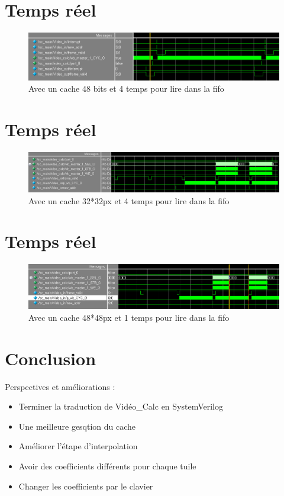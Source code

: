 \documentclass{beamer}
\begin{document}
\section{Temps réel}
\begin{frame}
\begin{figure}[!h]
\centering
\includegraphics[scale = 0.3]{wave_r.png}
\caption{Avec un cache 48 bits et 4 temps pour lire dans la fifo}
\end{figure}
\end{frame}

\section{Temps réel}
\begin{frame}
\begin{figure}[!h]
\centering
\includegraphics[scale = 0.3]{wave_cache32_r.png}
\caption{Avec un cache 32*32px et 4 temps pour lire dans la fifo}
\end{figure}
\end{frame}

\section{Temps réel}
\begin{frame}
\begin{figure}[!h]
\centering
\includegraphics[scale = 0.3]{wave_sans_wait_r.png}
\caption{Avec un cache 48*48px et 1 temps pour lire dans la fifo}
\end{figure}
\end{frame}

\section{Conclusion}
\centering
{Perspectives et améliorations :
	\begin{itemize}
		\item Terminer la traduction de Vidéo\_Calc en SystemVerilog
		\item Une meilleure gesqtion du cache
		\item Améliorer l'étape d'interpolation
		\item Avoir des coefficients différents pour chaque tuile
		\item Changer les coefficients par le clavier
	\end{itemize}}
\end{document}
